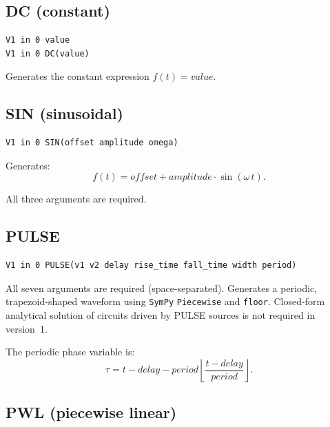 \documentclass[11pt,a4paper]{article}
\newcommand{\code}[1]{\texttt{#1}}
\newcommand{\sympy}{\texttt{SymPy}}
\begin{document}
\subsection{DC (constant)}

\begin{lstlisting}[language=spice]
V1 in 0 value
V1 in 0 DC(value)
\end{lstlisting}

Generates the constant expression \(f(t) = \textit{value}\).

\subsection{SIN (sinusoidal)}

\begin{lstlisting}[language=spice]
V1 in 0 SIN(offset amplitude omega)
\end{lstlisting}

Generates:
\begin{equation}
    f(t) = \textit{offset} + \textit{amplitude}\cdot\sin(\omega\, t).
\end{equation}

All three arguments are required.

\subsection{PULSE}

\begin{lstlisting}[language=spice]
V1 in 0 PULSE(v1 v2 delay rise_time fall_time width period)
\end{lstlisting}

All seven arguments are required (space-separated).
Generates a periodic, trapezoid-shaped waveform using \sympy{} \code{Piecewise}
and \code{floor}.
Closed-form analytical solution of circuits driven by PULSE sources is not
required in version~1.

The periodic phase variable is:
\begin{equation}
    \tau = t - \textit{delay}
           - \textit{period}\left\lfloor
               \frac{t - \textit{delay}}{\textit{period}}
             \right\rfloor.
\end{equation}

\subsection{PWL (piecewise linear)}
\end{document}
